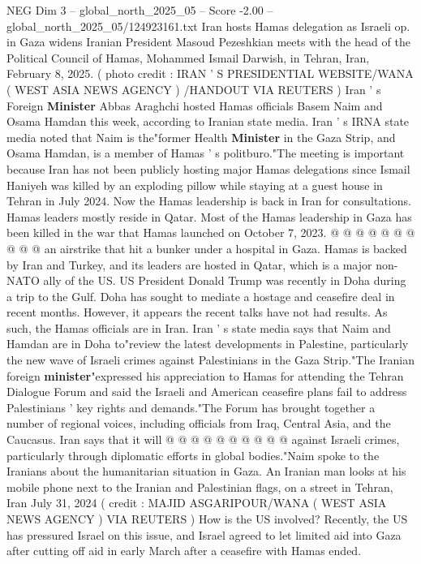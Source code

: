 \begin{textsample}{NEG Dim 3 – global\_north\_2025\_05 – Score -2.00 – global\_north\_2025\_05/124923161.txt}  \label{ex:f3_neg_312}
Iran hosts Hamas delegation as Israeli op. in Gaza widens Iranian President Masoud Pezeshkian meets with the head of the Political Council of Hamas, Mohammed Ismail Darwish, in Tehran, Iran, February 8, 2025. ( photo credit : IRAN ' S PRESIDENTIAL WEBSITE/WANA ( WEST ASIA NEWS AGENCY ) /HANDOUT VIA REUTERS ) Iran ' s Foreign \textbf{Minister} Abbas Araghchi hosted Hamas officials Basem Naim and Osama Hamdan this week, according to Iranian state media.
Iran ' s IRNA state media noted that Naim is the"former Health \textbf{Minister} in the Gaza Strip, and Osama Hamdan, is a member of Hamas ' s politburo."The meeting is important because Iran has not been publicly hosting major Hamas delegations since Ismail Haniyeh was killed by an exploding pillow while staying at a guest house in Tehran in July 2024.
Now the Hamas leadership is back in Iran for consultations.
Hamas leaders mostly reside in Qatar.
Most of the Hamas leadership in Gaza has been killed in the war that Hamas launched on October 7, 2023. @ @ @ @ @ @ @ @ @ @ an airstrike that hit a bunker under a hospital in Gaza.
Hamas is backed by Iran and Turkey, and its leaders are hosted in Qatar, which is a major non-NATO ally of the US.
US President Donald Trump was recently in Doha during a trip to the Gulf.
Doha has sought to mediate a hostage and ceasefire deal in recent months.
However, it appears the recent talks have not had results.
As such, the Hamas officials are in Iran.
Iran ' s state media says that Naim and Hamdan are in Doha to"review the latest developments in Palestine, particularly the new wave of Israeli crimes against Palestinians in the Gaza Strip."The Iranian foreign \textbf{minister}"expressed his appreciation to Hamas for attending the Tehran Dialogue Forum and said the Israeli and American ceasefire plans fail to address Palestinians ' key rights and demands."The Forum has brought together a number of regional voices, including officials from Iraq, Central Asia, and the Caucasus.
Iran says that it will @ @ @ @ @ @ @ @ @ @ against Israeli crimes, particularly through diplomatic efforts in global bodies."Naim spoke to the Iranians about the humanitarian situation in Gaza.
An Iranian man looks at his mobile phone next to the Iranian and Palestinian flags, on a street in Tehran, Iran July 31, 2024 ( credit : MAJID ASGARIPOUR/WANA ( WEST ASIA NEWS AGENCY ) VIA REUTERS ) How is the US involved?
Recently, the US has pressured Israel on this issue, and Israel agreed to let limited aid into Gaza after cutting off aid in early March after a ceasefire with Hamas ended.

\end{textsample}

